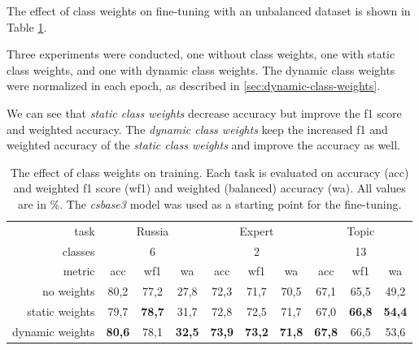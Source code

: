 \documentclass[
  printed, %
  color,   %
  table,   %
  oneside, %
  lof,     %
  lot,     %
]{fithesis3}
\begin{document}
\vspace{1em}
{\parindent=0cm
The effect of class weights on fine-tuning with an unbalanced dataset is shown in Table \ref{tab:class-weights-compare}. 
}

Three experiments were conducted, one without class weights, one with static class weights, and one with dynamic class weights.
The dynamic class weights were normalized in each epoch, as described in \ref{sec:dynamic-class-weights}.

We can see that \textit{static class weights} decrease accuracy but improve the f1 score and weighted accuracy. The \textit{dynamic class weights}  keep the increased f1 and weighted accuracy of the \textit{static class weights} and improve the accuracy as well.


\begin{table}[h]
\centering
\begin{adjustbox}{center}
\begin{tabular}{r|c|c|c|c|c|c|c|c|c}
    task & \multicolumn{3}{c|}{Russia} 
     & \multicolumn{3}{c|}{Expert}
     & \multicolumn{3}{c}{Topic} \\
    
    classes & \multicolumn{3}{c|}{6} & 
    \multicolumn{3}{c|}{2} & 
    \multicolumn{3}{c}{13} \\
    
    metric & acc & wf1 & wa & acc & wf1 & wa & acc & wf1 & wa \\
    \toprule
        no weights & 80,2 & 77,2 & 27,8 & 72,3 & 71,7 & 70,5 & 67,1 & 65,5 & 49,2 \\
        
        static weights & 79,7 & \textbf{78,7} & 31,7 & 72,8 & 72,5 & 71,7 & 67,0 & \textbf{66,8} & \textbf{54,4} \\
        
        dynamic weights & \textbf{80,6} & 78,1 & \textbf{32,5} & \textbf{73,9} & \textbf{73,2} & \textbf{71,8} & \textbf{67,8} & 66,5 & 53,6 \\
\end{tabular}
\end{adjustbox}
\caption[The effect of class weights on training]
{The effect of class weights on training. Each task is evaluated on accuracy (acc) and weighted f1 score (wf1) and weighted (balanced) accuracy (wa). All values are in \%. The \textit{csbase3} model was used as a starting point for the fine-tuning.}
\label{tab:class-weights-compare}
\end{table} %
\end{document}
